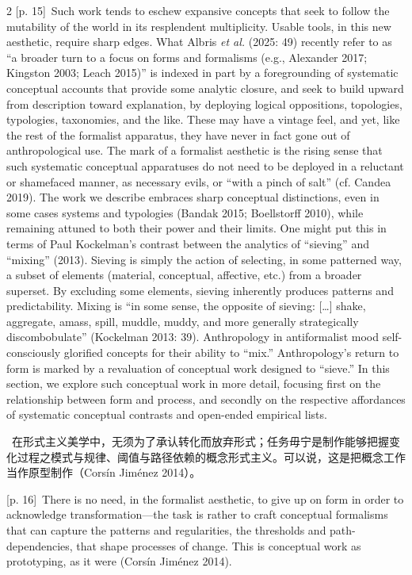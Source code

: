 \documentclass[10pt,a4paper]{article}
\begin{document}
\begin{paracol}{2}
\switchcolumn
{\scriptsize\color{gray} [p. 15]}\ Such work tends to eschew expansive concepts that seek to follow the mutability of the world in its resplendent multiplicity. Usable tools, in this new aesthetic, require sharp edges. What Albris \textit{et al.} (2025: 49) recently refer to as “a broader turn to a focus on forms and formalisms (e.g., Alexander 2017; Kingston 2003; Leach 2015)” is indexed in part by a foregrounding of systematic conceptual accounts that provide some analytic closure, and seek to build upward from description toward explanation, by deploying logical oppositions, topologies, typologies, taxonomies, and the like. These may have a vintage feel, and yet, like the rest of the formalist apparatus, they have never in fact gone out of anthropological use. The mark of a formalist aesthetic is the rising sense that such systematic conceptual apparatuses do not need to be deployed in a reluctant or shamefaced manner, as necessary evils, or “with a pinch of salt” (cf. Candea 2019). The work we describe embraces sharp conceptual distinctions, even in some cases systems and typologies (Bandak 2015; Boellstorff 2010), while remaining attuned to both their power and their limits. One might put this in terms of Paul Kockelman’s contrast between the analytics of “sieving” and “mixing” (2013). Sieving is simply the action of selecting, in some patterned way, a subset of elements (material, conceptual, affective, etc.) from a broader superset. By excluding some elements, sieving inherently produces patterns and predictability. Mixing is “in some sense, the opposite of sieving: […] shake, aggregate, amass, spill, muddle, muddy, and more generally strategically discombobulate” (Kockelman 2013: 39). Anthropology in antiformalist mood self-consciously glorified concepts for their ability to “mix.” Anthropology’s return to form is marked by a revaluation of conceptual work designed to “sieve.” In this section, we explore such conceptual work in more detail, focusing first on the relationship between form and process, and secondly on the respective affordances of systematic conceptual contrasts and open-ended empirical lists.\par
\switchcolumn*
{\scriptsize\color{gray} [p. 16]}\ 在形式主义美学中，无须为了承认转化而放弃形式；任务毋宁是制作能够把握变化过程之模式与规律、阈值与路径依赖的概念形式主义。可以说，这是把概念工作当作原型制作（Corsín Jiménez 2014）。\par
\switchcolumn
{\scriptsize\color{gray} [p. 16]}\ There is no need, in the formalist aesthetic, to give up on form in order to acknowledge transformation—the task is rather to craft conceptual formalisms that can capture the patterns and regularities, the thresholds and path-dependencies, that shape processes of change. This is conceptual work as prototyping, as it were (Corsín Jiménez 2014).\par

\end{paracol}
\end{document}
